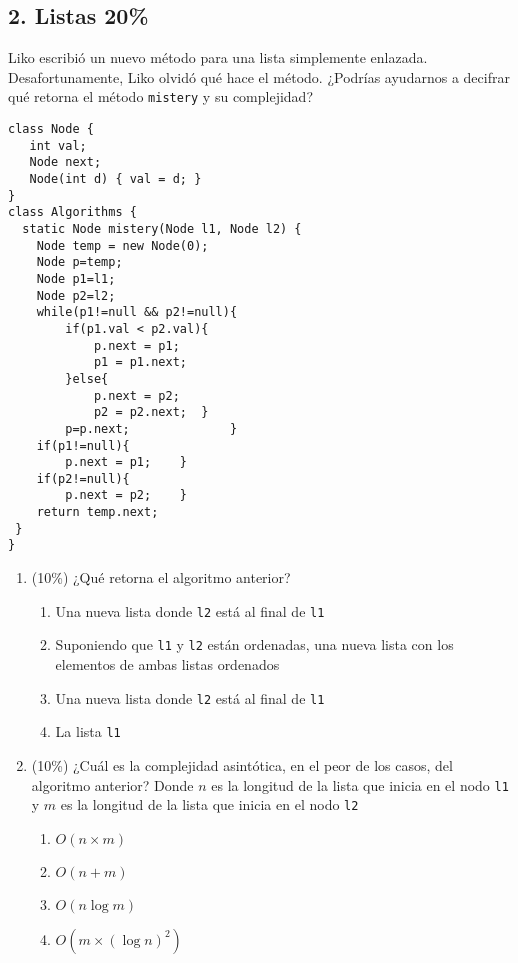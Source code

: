 \documentclass[10 pt]{article}
\begin{document}
\begin{multicols}{2}
\section{2. Listas 20\%}
Liko escribió un nuevo método para una lista simplemente enlazada. Desafortunamente, Liko olvidó
qué hace el método. ¿Podrías ayudarnos a decifrar qué retorna el método \texttt{mistery} y su complejidad?
{\footnotesize
\begin{lstlisting}
class Node { 
   int val; 
   Node next; 
   Node(int d) { val = d; } 
} 
class Algorithms { 
  static Node mistery(Node l1, Node l2) {
    Node temp = new Node(0);
    Node p=temp;
    Node p1=l1;
    Node p2=l2;
    while(p1!=null && p2!=null){
        if(p1.val < p2.val){
            p.next = p1;
            p1 = p1.next;
        }else{
            p.next = p2;
            p2 = p2.next;  }
        p=p.next;              }
    if(p1!=null){
        p.next = p1;    }
    if(p2!=null){
        p.next = p2;    }
    return temp.next;
 }
}
\end{lstlisting}
}
\begin{enumerate}[label=\alph*]
	\item (10\%) ¿Qué retorna el algoritmo anterior?
	\begin{enumerate}[label=\roman*]
		\item Una nueva lista donde \texttt{l2} está al final de \texttt{l1}
		\item Suponiendo que \texttt{l1} y \texttt{l2} están ordenadas, una nueva lista con los elementos de ambas listas ordenados
		\item Una nueva lista donde \texttt{l2} está al final de \texttt{l1}
		\item La lista \texttt{l1}
	\end{enumerate}
	\item (10\%) ¿Cuál es la complejidad asintótica, en el peor de los casos, del algoritmo anterior? Donde $n$ es la longitud de la lista que inicia en el nodo \texttt{l1} y $m$ es la longitud de la lista que inicia en el nodo \texttt{l2}
	\begin{enumerate}[label=\roman*]
		\item $O(n \times m)$
		\item $O(n + m)$
		\item $O(n\log m)$
		\item $O(m \times (\log n)^2)$
	\end{enumerate}
\end{enumerate}




\end{multicols}
\end{document}
